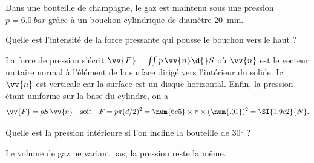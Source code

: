 \hauteurLargeurCadreReponse		{7mm}{2cm}
\initialisationEntrainement

Dans une bouteille de champagne, le gaz est maintenu sous une pression $p=\SI{6.0}{bar}$ grâce à un bouchon cylindrique de diamètre 20~mm. 

\debutEntrainement


\begin{enonce}
Quelle est l'intensité de la force pressante qui pousse le bouchon vers le haut ?
\end{enonce}

\begin{corrige}
La force de pression s'écrit $\vv{F}=\iint p\, \vv{n}\d{}S$ où $\vv{n}$ est le vecteur unitaire normal à l'élément de la surface dirigé vers l'intérieur du solide. Ici $\vv{n}$ est verticale car la surface est un disque horizontal. Enfin, la pression étant uniforme sur la base du cylindre, on a 
\[
\vv{F}=pS\,\vv{n}
\quad\text{soit}\quad
F=p\pi (d/2)^2=\num{6e5}\times \pi\times (\num{.01})^2=\SI{1.9e2}{N}.
\]
\end{corrige}



\begin{enonce}
Quelle est la pression intérieure si l'on incline la bouteille de \ang{30} ?
\end{enonce}

\begin{corrige}
Le volume de gaz ne variant pas, la pression reste la même.
\end{corrige}

